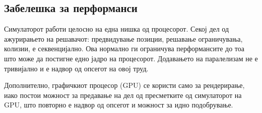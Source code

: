 \subsection{Забелешка за перформанси}

Симулаторот работи целосно на една нишка од процесорот. Секој дел од ажурирањето на решавачот: предвидување позиции, решавање ограничувања, колизии, е секвенцијално. Ова нормално ги ограничува перформансите до тоа што може да постигне едно јадро на процесорот. Додавањето на паралелизам не е тривијално и е надвор од опсегот на овој труд.

Дополнително, графичкиот процесор (GPU) се користи само за рендерирање, иако постои можност за предавање на дел од пресметките од симулаторот на GPU, што повторно е надвор од опсегот и можност за идно подобрување. 